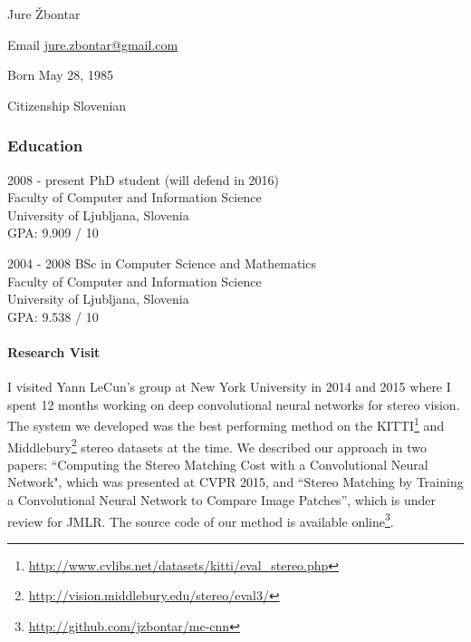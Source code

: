 \documentclass[12pt,a4paper]{article}
\begin{document}
\begin{cv}{Jure \v{Z}bontar}

\begin{cvlist}{}
\item[Email] \href{mailto:jure.zbontar@gmail.com}{jure.zbontar@gmail.com}

\item[Born] May 28, 1985
\item[Citizenship] Slovenian

\end{cvlist}

\subsubsection*{Education}
\begin{cvlist}{}
\item[2008 - present] PhD student (will defend in 2016) \\
Faculty of Computer and Information Science \\
University of Ljubljana, Slovenia \\
GPA: 9.909 / 10

\item[2004 - 2008] BSc in Computer Science and Mathematics \\
Faculty of Computer and Information Science \\
University of Ljubljana, Slovenia \\
GPA: 9.538 / 10

\end{cvlist}

\paragraph{Research Visit}
I visited Yann LeCun's group at New York University in 2014 and 2015 where I
spent 12 months working on deep convolutional neural networks for stereo
vision. The system we developed was the best performing method on the
KITTI\footnote{\url{http://www.cvlibs.net/datasets/kitti/eval_stereo.php}} and
Middlebury\footnote{\url{http://vision.middlebury.edu/stereo/eval3/}} stereo
datasets at the time. We described our approach in two papers: ``Computing the
Stereo Matching Cost with a Convolutional Neural Network", which was presented
at CVPR 2015, and ``Stereo Matching by Training a Convolutional Neural Network
to Compare Image Patches'', which is under review for JMLR. The source code of
our method is available
online\footnote{\url{http://github.com/jzbontar/mc-cnn}}.


\end{cv}
\end{document}
